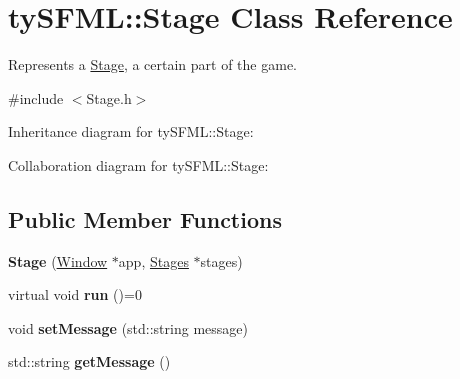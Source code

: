 \hypertarget{classty_s_f_m_l_1_1_stage}{}\section{ty\+S\+F\+M\+L\+:\+:Stage Class Reference}
\label{classty_s_f_m_l_1_1_stage}


Represents a \hyperlink{classty_s_f_m_l_1_1_stage}{Stage}, a certain part of the game.  




{\ttfamily \#include $<$Stage.\+h$>$}



Inheritance diagram for ty\+S\+F\+M\+L\+:\+:Stage\+:


Collaboration diagram for ty\+S\+F\+M\+L\+:\+:Stage\+:
\subsection*{Public Member Functions}
\begin{DoxyCompactItemize}
\item 
\hypertarget{classty_s_f_m_l_1_1_stage_a1f37edd56fe5f10554691db6bf5f10c8}{}{\bfseries Stage} (\hyperlink{classty_s_f_m_l_1_1_window}{Window} $\ast$app, \hyperlink{structty_s_f_m_l_1_1_stages}{Stages} $\ast$stages)\label{classty_s_f_m_l_1_1_stage_a1f37edd56fe5f10554691db6bf5f10c8}

\item 
\hypertarget{classty_s_f_m_l_1_1_stage_a47cc5ab0c84fd8b5a3f70a2678757bc5}{}virtual void {\bfseries run} ()=0\label{classty_s_f_m_l_1_1_stage_a47cc5ab0c84fd8b5a3f70a2678757bc5}

\item 
\hypertarget{classty_s_f_m_l_1_1_stage_a1d7c58d9e7532335f11ebf1abff1eb0f}{}void {\bfseries set\+Message} (std\+::string message)\label{classty_s_f_m_l_1_1_stage_a1d7c58d9e7532335f11ebf1abff1eb0f}

\item 
\hypertarget{classty_s_f_m_l_1_1_stage_a12deed89486b0e04ebc02f0ac5b4aa2f}{}std\+::string {\bfseries get\+Message} ()\label{classty_s_f_m_l_1_1_stage_a12deed89486b0e04ebc02f0ac5b4aa2f}

\end{DoxyCompactItemize}
